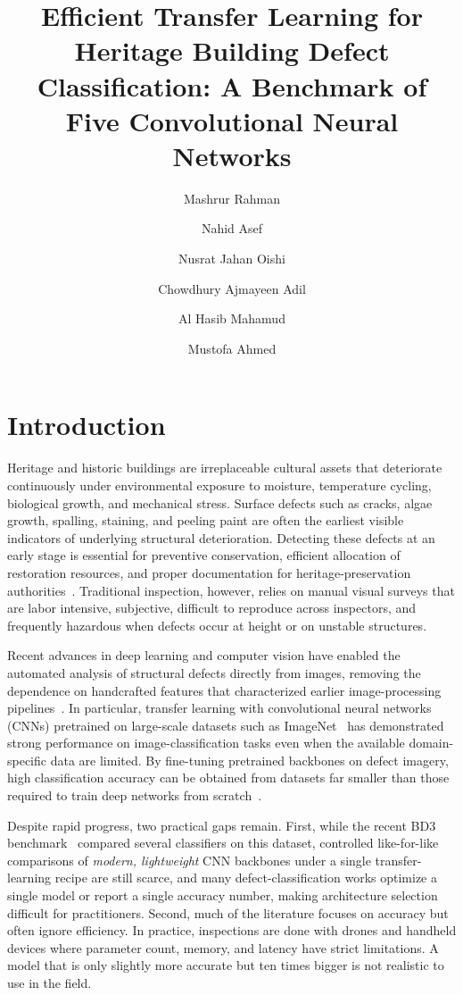\documentclass[ASNA, twocolumn]{USG}
\title{Efficient Transfer Learning for Heritage Building Defect Classification: A Benchmark of Five Convolutional Neural Networks}
\author[1]{Mashrur Rahman}
\author[1]{Nahid Asef}
\author[1]{Nusrat Jahan Oishi}
\author[1]{Chowdhury Ajmayeen Adil}
\author[1]{Al Hasib Mahamud}
\author[1]{Mustofa Ahmed}
\begin{document}
\maketitle

\section{Introduction}

Heritage and historic buildings are irreplaceable cultural assets that deteriorate continuously under environmental exposure to moisture, temperature cycling, biological growth, and mechanical stress. Surface defects such as cracks, algae growth, spalling, staining, and peeling paint are often the earliest visible indicators of underlying structural deterioration. Detecting these defects at an early stage is essential for preventive conservation, efficient allocation of restoration resources, and proper documentation for heritage-preservation authorities~\cite{ref1}. Traditional inspection, however, relies on manual visual surveys that are labor intensive, subjective, difficult to reproduce across inspectors, and frequently hazardous when defects occur at height or on unstable structures.

Recent advances in deep learning and computer vision have enabled the automated analysis of structural defects directly from images, removing the dependence on handcrafted features that characterized earlier image-processing pipelines~\cite{ref5}. In particular, transfer learning with convolutional neural networks (CNNs) pretrained on large-scale datasets such as ImageNet~\cite{ref23} has demonstrated strong performance on image-classification tasks even when the available domain-specific data are limited. By fine-tuning pretrained backbones on defect imagery, high classification accuracy can be obtained from datasets far smaller than those required to train deep networks from scratch~\cite{ref22}.

Despite rapid progress, two practical gaps remain. First, while the recent BD3 benchmark~\cite{ref40} compared several classifiers on this dataset, controlled like-for-like comparisons of \emph{modern, lightweight} CNN backbones under a single transfer-learning recipe are still scarce, and many defect-classification works optimize a single model or report a single accuracy number, making architecture selection difficult for practitioners. Second, much of the literature focuses on accuracy but often ignore efficiency. In practice, inspections are done with drones and handheld devices where parameter count, memory, and latency have strict limitations. A model that is only slightly more accurate but ten times bigger is not realistic to use in the field.
\end{document}
